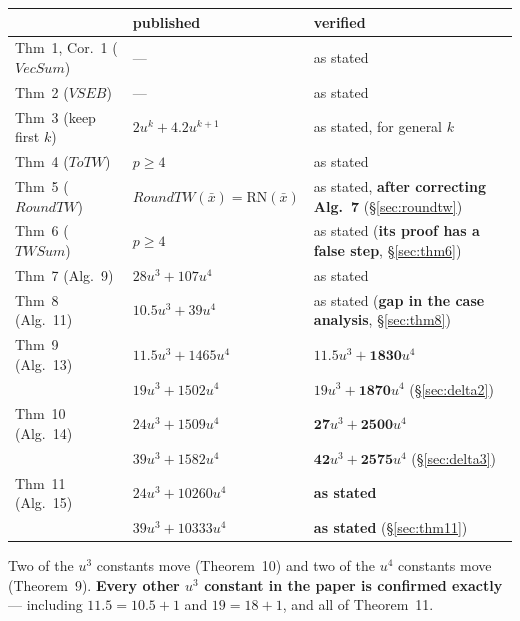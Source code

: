 \documentclass[11pt,a4paper]{article}
\newcommand{\RN}{\mathrm{RN}}
\newcommand{\alg}[1]{\mathit{#1}}
\begin{document}
\begin{center}
\begin{tabular}{@{}lll@{}}
\toprule
 & published & verified \\
\midrule
Thm~1, Cor.~1 ($\alg{VecSum}$)   & ---                       & as stated \\
Thm~2 ($\alg{VSEB}$)             & ---                       & as stated \\
Thm~3 (keep first $k$)           & $2u^k + 4.2u^{k+1}$       & as stated, for general $k$ \\
Thm~4 ($\alg{ToTW}$)             & $p \geq 4$                & as stated \\
Thm~5 ($\alg{RoundTW}$)          & $\alg{RoundTW}(\bar x) = \RN(\bar x)$
                                 & as stated, \textbf{after correcting Alg.~7} (\S\ref{sec:roundtw}) \\
Thm~6 ($\alg{TWSum}$)            & $p \geq 4$
                                 & as stated (\textbf{its proof has a false step}, \S\ref{sec:thm6}) \\
Thm~7 (Alg.~9)                   & $28u^3 + 107u^4$          & as stated \\
Thm~8 (Alg.~11)                  & $10.5u^3 + 39u^4$
                                 & as stated (\textbf{gap in the case analysis}, \S\ref{sec:thm8}) \\
Thm~9 (Alg.~13)                  & $11.5u^3 + 1465u^4$       & $11.5u^3 + \mathbf{1830}u^4$ \\
                                 & $19u^3 + 1502u^4$         & $19u^3 + \mathbf{1870}u^4$ \quad (\S\ref{sec:delta2}) \\
Thm~10 (Alg.~14)                 & $24u^3 + 1509u^4$         & $\mathbf{27}u^3 + \mathbf{2500}u^4$ \\
                                 & $39u^3 + 1582u^4$         & $\mathbf{42}u^3 + \mathbf{2575}u^4$ \quad (\S\ref{sec:delta3}) \\
Thm~11 (Alg.~15)                 & $24u^3 + 10260u^4$        & \textbf{as stated} \\
                                 & $39u^3 + 10333u^4$        & \textbf{as stated} \quad (\S\ref{sec:thm11}) \\
\bottomrule
\end{tabular}
\end{center}

\medskip
\noindent
Two of the $u^3$ constants move (Theorem~10) and two of the $u^4$ constants
move (Theorem~9). \textbf{Every other $u^3$ constant in the paper is confirmed
exactly} --- including $11.5 = 10.5 + 1$ and $19 = 18 + 1$, and all of
Theorem~11.
\end{document}
